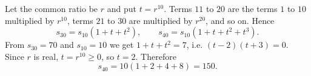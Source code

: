 Let the common ratio be $r$ and put $t=r^{10}$. Terms $11$ to $20$ are the terms $1$ to $10$ multiplied by $r^{10}$, terms $21$ to $30$ are multiplied by $r^{20}$, and so on. Hence
\[s_{30}=s_{10}\left(1+t+t^2\right),\qquad s_{40}=s_{10}\left(1+t+t^2+t^3\right).\]
From $s_{30}=70$ and $s_{10}=10$ we get $1+t+t^2=7$, i.e. $(t-2)(t+3)=0$. Since $r$ is real, $t=r^{10}\ge0$, so $t=2$. Therefore
\[s_{40}=10\left(1+2+4+8\right)=\boxed{150}.\]
